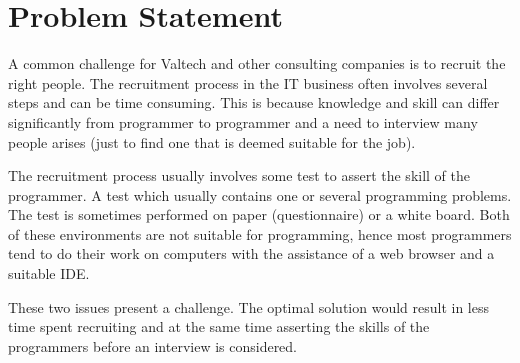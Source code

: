 \section{Problem Statement}
A common challenge for Valtech and other consulting companies is to recruit the right people. The recruitment process in the IT business often involves several steps and can be time consuming. This is because knowledge and skill can differ significantly from programmer to programmer and a need to interview many people arises (just to find one that is deemed suitable for the job).

The recruitment process usually involves some test to assert the skill of the programmer. A test which usually contains one or several programming problems. The test is sometimes performed on paper (questionnaire) or a white board. Both of these environments are not suitable for programming, hence most programmers tend to do their work on computers with the assistance of a web browser and a suitable IDE.

These two issues present a challenge. The optimal solution would result in less time spent recruiting and at the same time asserting the skills of the programmers before an interview is considered.
